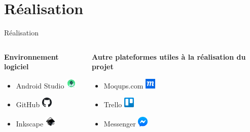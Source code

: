 \documentclass{beamer}
\begin{document}
\section{Réalisation}

\begin{frame}{Réalisation}
    \begin{columns}[T]
    \begin{column}[c]{5cm}
        \textbf{Environnement logiciel}
        \vspace{2em}
        \begin{itemize}[label=\textbullet]
            \item Android Studio \includegraphics[height=0.5cm]{Images/1200px-Android_Studio_icon.svg.png}
            \item GitHub \includegraphics[height=0.5cm]{Images/1200px-Octicons-mark-github.svg.png}
            \item Inkscape \includegraphics[height=0.5cm]{Images/1200px-Inkscape_Logo.svg.png}
        \end{itemize}
    \end{column}
    \begin{column}[c]{5cm}
        \textbf{Autre plateformes utiles à la réalisation du projet}
        \vspace{1em}
        \begin{itemize}[label=\textbullet]
            \item Moqups.com \includegraphics[height=0.5cm]{Images/moqups.png}
            \item Trello \includegraphics[height=0.5cm]{Images/logo_trello.png}
            \item Messenger \includegraphics[height=0.5cm]{Images/1200px-Facebook_Messenger_4_Logo.svg.png}
        \end{itemize}
    \end{column}
    \end{columns}
\end{frame}
\end{document}
